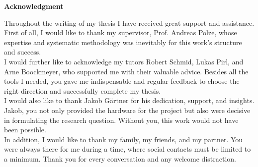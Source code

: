 \vspace*{\fill}
\begin{center}\textsf{\textbf{Acknowledgment}}\end{center}

\noindent Throughout the writing of my thesis I have received great support and assistance.
\\

\noindent First of all, I would like to thank my supervisor, Prof. Andreas Polze, whose expertise and systematic methodology was inevitably for this work's structure and success.
\\

\noindent I would further like to acknowledge my tutors Robert Schmid, Lukas Pirl, and Arne Boockmeyer, who supported me with their valuable advice.
Besides all the tools I needed, you gave me indispensable and regular feedback to choose the right direction and successfully complete my thesis.
\\

\noindent I would also like to thank Jakob Gärtner for his dedication, support, and insights.
Jakob, you not only provided the hardware for the project but also were decisive in formulating the research question.
Without you, this work would not have been possible.
\\

\noindent In addition, I would like to thank my family, my friends, and my partner.
You were always there for me during a time, where social contacts must be limited to a minimum.
Thank you for every conversation and any welcome distraction. 


\vspace*{\fill}